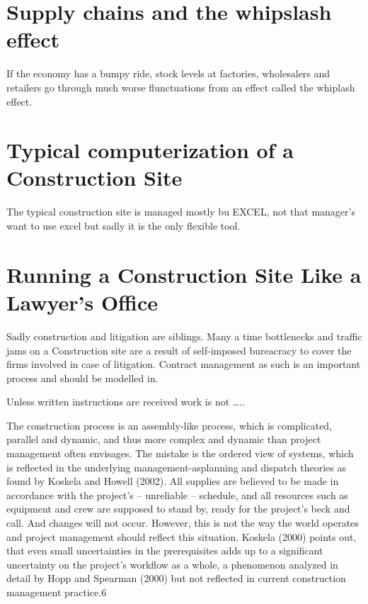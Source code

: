 \section*{Supply chains and the whipslash effect}

If the economy has a bumpy ride, stock levels at factories, wholesalers and retailers go through much worse flunctuations from an effect called the whiplash effect.


\section*{Typical computerization of a Construction Site}

The typical construction site is managed mostly bu EXCEL, not that manager's want to use excel but sadly it is the only flexible tool.


\section*{Running a Construction Site Like a Lawyer's Office}

Sadly construction and litigation are siblings. Many a time bottlenecks and traffic jams on a Construction site are a result of self-imposed bureacracy to cover the firms involved in case of litigation. Contract management as such is an important process and should be modelled in.

Unless written instructions are received work is not \ldots..




The construction process is an assembly-like process, which is complicated, parallel and dynamic,
and thus more complex and dynamic than project management often envisages. The
mistake is the ordered view of systems, which is reflected in the underlying management-asplanning
and dispatch theories as found by Koskela and Howell (2002). All supplies are believed
to be made in accordance with the project's – unreliable – schedule, and all resources
such as equipment and crew are supposed to stand by, ready for the project’s beck and call.
And changes will not occur. However, this is not the way the world operates and project
management should reflect this situation. Koskela (2000) points out, that even small uncertainties
in the prerequisites adds up to a significant uncertainty on the project’s workflow as a
whole, a phenomenon analyzed in detail by Hopp and Spearman (2000) but not reflected in
current construction management practice.6


